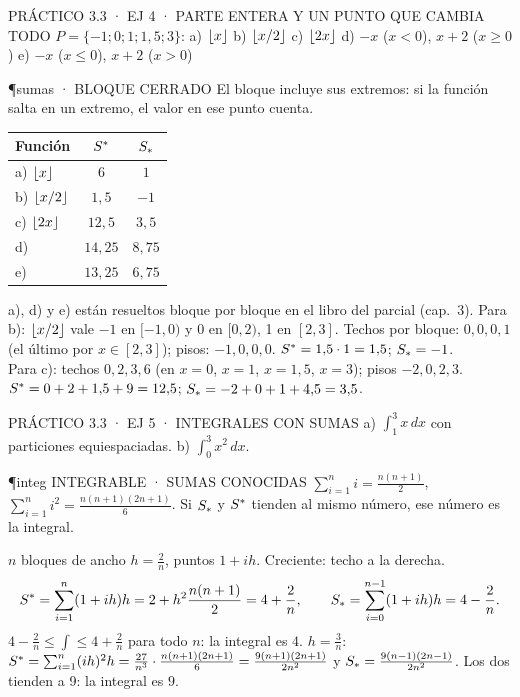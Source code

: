 \begin{enunciado}{PRÁCTICO 3.3 · EJ 4 · PARTE ENTERA Y UN PUNTO QUE CAMBIA TODO}
$P=\{-1;0;1;1{,}5;3\}$: a) $\lfloor x\rfloor$ b) $\lfloor x/2\rfloor$ c) $\lfloor 2x\rfloor$ d) $-x$ ($x<0$), $x+2$ ($x\ge0$) e) $-x$ ($x\le0$), $x+2$ ($x>0$)
\end{enunciado}
\begin{uso}{\P{sumas} · BLOQUE CERRADO}
El bloque incluye sus extremos: si la función salta en un extremo, el valor en ese punto cuenta.
\end{uso}
\begin{center}\small
\begin{tabular}{@{}lcc@{}}\toprule
Función & $S^{*}$ & $S_{*}$\\\midrule
a) $\lfloor x\rfloor$ & $6$ & $1$\\
b) $\lfloor x/2\rfloor$ & $1{,}5$ & $-1$\\
c) $\lfloor 2x\rfloor$ & $12{,}5$ & $3{,}5$\\
d) & $14{,}25$ & $8{,}75$\\
e) & $13{,}25$ & $6{,}75$\\\bottomrule
\end{tabular}
\end{center}
a), d) y e) están resueltos bloque por bloque en el libro del parcial (cap.\ 3). Para b): $\lfloor x/2\rfloor$ vale $-1$ en $[-1,0)$ y $0$ en $[0,2)$, 1 en $[2,3]$. Techos por bloque: $0,0,0,1$ (el último por $x\in[2,3]$); pisos: $-1,0,0,0$. $S^{*}=1{,}5\cdot1=1{,}5$; $S_{*}=-1$.\\
Para c): techos $0,2,3,6$ (en $x=0$, $x=1$, $x=1{,}5$, $x=3$); pisos $-2,0,2,3$. $S^{*}=0+2+1{,}5+9=12{,}5$; $S_{*}=-2+0+1+4{,}5=3{,}5$.

\begin{enunciado}{PRÁCTICO 3.3 · EJ 5 · INTEGRALES CON SUMAS}
a) $\int_1^3x\,dx$ con particiones equiespaciadas. b) $\int_0^3x^2\,dx$.
\end{enunciado}
\begin{uso}{\P{integ} INTEGRABLE · SUMAS CONOCIDAS}
$\sum_{i=1}^ni=\frac{n(n+1)}2$, \ $\sum_{i=1}^ni^2=\frac{n(n+1)(2n+1)}6$. Si $S_{*}$ y $S^{*}$ tienden al mismo número, ese número es la integral.
\end{uso}
$n$ bloques de ancho $h=\frac2n$, puntos $1+ih$. Creciente: techo a la derecha.
\[S^{*}=\sum_{i=1}^n(1+ih)h=2+h^2\frac{n(n+1)}2=4+\frac2n,\qquad S_{*}=\sum_{i=0}^{n-1}(1+ih)h=4-\frac2n.\]
$4-\frac2n\le\int\le4+\frac2n$ para todo $n$: la integral es $4$.
$h=\frac3n$: $S^{*}=\sum_{i=1}^n(ih)^2h=\frac{27}{n^3}\cdot\frac{n(n+1)(2n+1)}6=\frac{9(n+1)(2n+1)}{2n^2}$ y $S_{*}=\frac{9(n-1)(2n-1)}{2n^2}$. Los dos tienden a 9: la integral es $9$.

